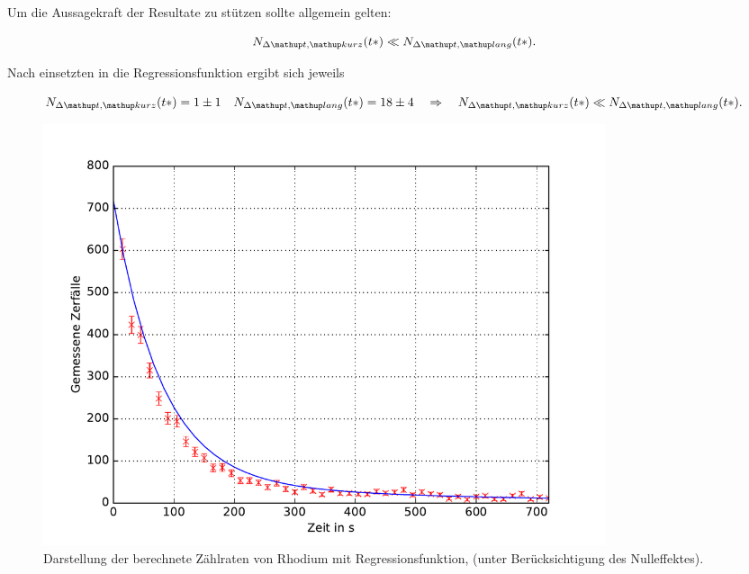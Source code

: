 Um die Aussagekraft der Resultate zu stützen sollte allgemein gelten:

\begin{equation*}
  N_{\Delta \map{t}, \map{kurz}}(t*)\ll N_{\Delta \map{t}, \map{lang}}(t*).
\end{equation*}

Nach einsetzten in die Regressionsfunktion ergibt sich jeweils

\begin{equation*}
    N_{\Delta \map{t}, \map{kurz}}(t*)= 1\pm1 \quad  N_{\Delta \map{t}, \map{lang}}(t*)= 18\pm 4 \quad \Rightarrow \quad N_{\Delta \map{t}, \map{kurz}}(t*)\ll N_{\Delta \map{t}, \map{lang}}(t*).
\end{equation*}

\begin{figure}
  \centering
  \includegraphics[width=0.8\textwidth]{pics/ra_addi.pdf}
  \caption{ Darstellung der berechnete Zählraten von Rhodium mit Regressionsfunktion, (unter Berücksichtigung des Nulleffektes).}
  \label{fig: plot_rhodium_addi}
\end{figure}
